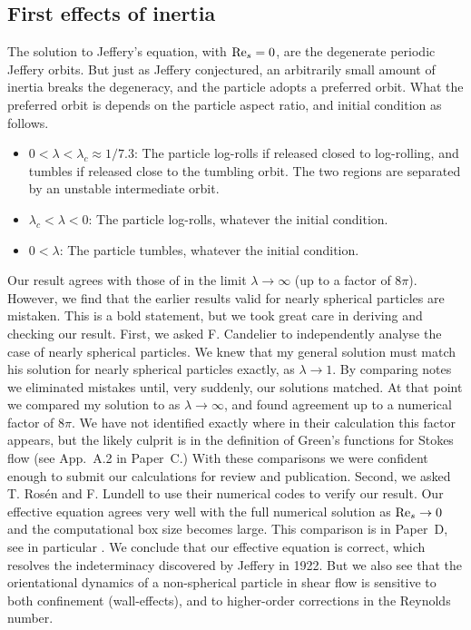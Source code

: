 \documentclass[thesis.tex]{subfiles}
\begin{document}
\subsection*{First effects of inertia}

The solution to Jeffery's equation,  with $\textrm{Re}_s=0$, are the degenerate periodic Jeffery orbits. But just as Jeffery conjectured, an arbitrarily small amount of inertia breaks the degeneracy, and the particle adopts a preferred orbit. What the preferred orbit is depends on the particle aspect ratio, and initial condition as follows.
\begin{itemize}
    \item $0 < \lambda < \lambda_c \approx 1/7.3$: The particle log-rolls if released closed to log-rolling, and tumbles if released close to the tumbling orbit. The two regions are separated by an unstable intermediate orbit.
    \item $\lambda_c < \lambda < 0$: The particle log-rolls, whatever the initial condition.
    \item $0 < \lambda$: The particle tumbles, whatever the initial condition.
\end{itemize}

Our result  agrees with those of \citet{subramanian2005} in the limit $\lambda\to\infty$ (up to a factor of $8\pi$). However, we find that the earlier results valid for nearly spherical particles \cite{saffman1956,subramanian2006} are mistaken. This is a bold statement, but we took great care in deriving and checking our result. First, we asked F. Candelier to independently analyse the case of nearly spherical particles. We knew that my general solution must match his solution for nearly spherical particles exactly, as $\lambda\to1$. By comparing notes we eliminated mistakes until, very suddenly, our solutions matched. At that point we compared my solution to \citet{subramanian2005} as $\lambda\to\infty$, and found agreement up to a numerical factor of $8\pi$. We have not identified exactly where in their calculation this factor appears, but the likely culprit is in the definition of Green's functions for Stokes flow (see App.~A.2 in Paper~C.) With these comparisons we were confident enough to submit our calculations for review and publication. Second, we asked T. Ros\'en and F. Lundell to use their numerical codes to verify our result. Our effective equation  agrees very well with the full numerical solution as $\textrm{Re}_s\to0$ and the computational box size becomes large. This comparison is in Paper~D, see in particular . We conclude that our effective equation is correct, which resolves the indeterminacy discovered by Jeffery in 1922. But we also see that the orientational dynamics of a non-spherical particle in shear flow is sensitive to both confinement (wall-effects), and to higher-order corrections in the Reynolds number.
\end{document}
